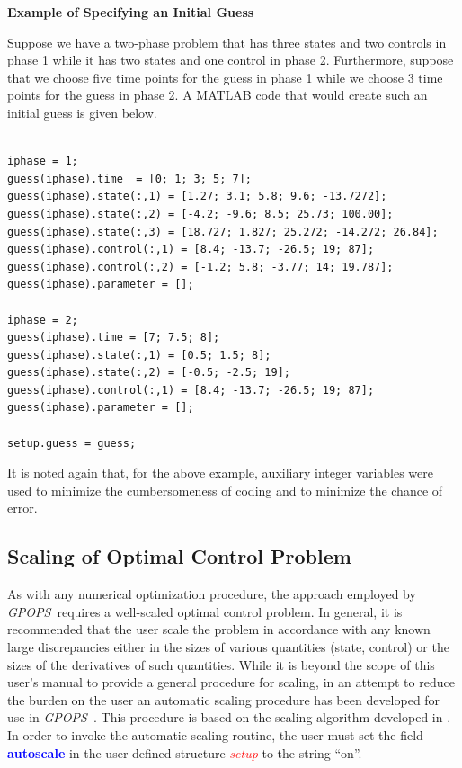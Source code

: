 \documentclass[10pt]{article}
\newcommand{\gpops}{{\em GPOPS}~}
\newenvironment{shadedframe}{%
  \def\FrameCommand{\fcolorbox{black}{shadecolor}}%
  \MakeFramed {\FrameRestore}}
{\endMakeFramed}
\newcommand{\bfblue}[1]{\textcolor{blue}{\bf #1}}
\newcommand{\slred}[1]{\textcolor{red}{\sl #1}}
\begin{document}
\scriptsize
\begin{shadedframe}

{\noindent}{\bf Example of Specifying an Initial Guess}

\vspace{12pt}
Suppose we have a two-phase problem that has three states and two controls in
phase 1 while it has two states and one control in phase 2.  Furthermore,
suppose that we choose five time points for the guess in phase 1 while we
choose 3 time points for the guess in phase 2.  A MATLAB code that would
create such an initial guess is given below.
\begin{verbatim}

iphase = 1;
guess(iphase).time  = [0; 1; 3; 5; 7];
guess(iphase).state(:,1) = [1.27; 3.1; 5.8; 9.6; -13.7272];
guess(iphase).state(:,2) = [-4.2; -9.6; 8.5; 25.73; 100.00];
guess(iphase).state(:,3) = [18.727; 1.827; 25.272; -14.272; 26.84];
guess(iphase).control(:,1) = [8.4; -13.7; -26.5; 19; 87];
guess(iphase).control(:,2) = [-1.2; 5.8; -3.77; 14; 19.787];
guess(iphase).parameter = [];

iphase = 2;
guess(iphase).time = [7; 7.5; 8];
guess(iphase).state(:,1) = [0.5; 1.5; 8];
guess(iphase).state(:,2) = [-0.5; -2.5; 19];
guess(iphase).control(:,1) = [8.4; -13.7; -26.5; 19; 87];
guess(iphase).parameter = [];

setup.guess = guess;

\end{verbatim}
\end{shadedframe}
\normalsize 
It is noted again that, for the above example, auxiliary integer
variables were used to minimize the cumbersomeness of coding and to
minimize the chance of error.

\subsection{Scaling of Optimal Control Problem\label{sect:scaling}}

As with any numerical optimization procedure, the approach employed by
\gpops requires a well-scaled optimal control problem.  In general, it is
recommended that the user scale the problem in accordance with any known large
discrepancies either in the sizes of various quantities (\ie state, control)
or the sizes of the derivatives of such quantities.  While it is beyond the
scope of this user's manual to provide a general procedure for scaling, in an
attempt to reduce the burden on the user an automatic scaling procedure has
been developed for use in \gpops.  This procedure is based on the scaling
algorithm developed in \cite{Betts1}.  In order to invoke the automatic
scaling routine, the user must set the field \bfblue{autoscale} in the
user-defined structure \slred{setup} to the string ``on''.
\end{document}
